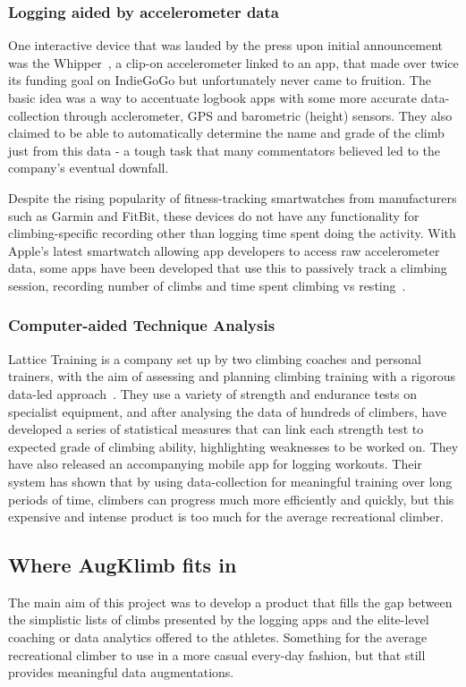 \subsubsection{Logging aided by accelerometer data}
One interactive device that was lauded by the press upon initial announcement was the Whipper~\cite{whipper}, a clip-on accelerometer linked to an app, that made over twice its funding goal on IndieGoGo but unfortunately never came to fruition.
The basic idea was a way to accentuate logbook apps with some more accurate data-collection through acclerometer, GPS and barometric (height) sensors.
They also claimed to be able to automatically determine the name and grade of the climb just from this data - a tough task that many commentators believed led to the company's eventual downfall.

Despite the rising popularity of fitness-tracking smartwatches from manufacturers such as Garmin and FitBit, these devices do not have any functionality for climbing-specific recording other than logging time spent doing the activity.
With Apple's latest smartwatch allowing app developers to access raw accelerometer data, some apps have been developed that use this to passively track a climbing session, recording number of climbs and time spent climbing vs resting~\cite{chalkprint}.

\subsubsection{Computer-aided Technique Analysis}
Lattice Training is a company set up by two climbing coaches and personal trainers, with the aim of assessing and planning climbing training with a rigorous data-led approach~\cite{lattice}.
They use a variety of strength and endurance tests on specialist equipment, and after analysing the data of hundreds of climbers, have developed a series of statistical measures that can link each strength test to expected grade of climbing ability, highlighting weaknesses to be worked on.
They have also released an accompanying mobile app for logging workouts. 
Their system has shown that by using data-collection for meaningful training over long periods of time,  climbers can progress much more efficiently and quickly, but this expensive and intense product is too much for the average recreational climber.



\subsection{Where AugKlimb fits in}
The main aim of this project was to develop a product that fills the gap between the simplistic lists of climbs presented by the logging apps and the elite-level coaching or data analytics offered to the athletes.
Something for the average recreational climber to use in a more casual every-day fashion, but that still provides meaningful data augmentations.










